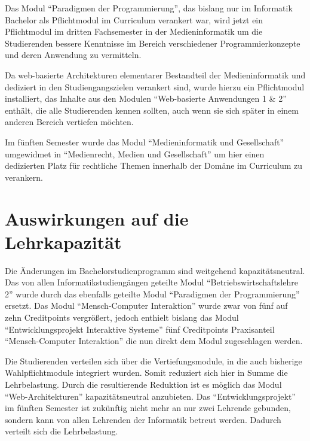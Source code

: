 Das Modul ``Paradigmen der Programmierung'', das bislang nur im
Informatik Bachelor als Pflichtmodul im Curriculum verankert war, wird
jetzt ein Pflichtmodul im dritten Fachsemester in der Medieninformatik
um die Studierenden bessere Kenntnisse im Bereich verschiedener
Programmierkonzepte und deren Anwendung zu vermitteln.

Da web-basierte Architekturen elementarer Bestandteil der
Medieninformatik und dediziert in den Studiengangszielen verankert sind,
wurde hierzu ein Pflichtmodul installiert, das Inhalte aus den Modulen
``Web-basierte Anwendungen 1 \& 2'' enthält, die alle Studierenden
kennen sollten, auch wenn sie sich später in einem anderen Bereich
vertiefen möchten.

Im fünften Semester wurde das Modul ``Medieninformatik und
Gesellschaft'' umgewidmet in ``Medienrecht, Medien und Gesellschaft'' um
hier einen dedizierten Platz für rechtliche Themen innerhalb der Domäne
im Curriculum zu verankern.

\section{Auswirkungen auf die
Lehrkapazität\label{/mi-2017/selbstbericht/0150-soll-zustand-geplante-veraenderungen/0000-geplante-veraenderungen-bachelor}}\label{auswirkungen-auf-die-lehrkapazituxe4tpathlabelmi-2017selbstbericht0150-soll-zustand-geplante-veraenderungen0000-geplante-veraenderungen-bachelor}

Die Änderungen im Bachelorstudienprogramm sind weitgehend
kapazitätsneutral. Das von allen Informatikstudiengängen geteilte Modul
``Betriebswirtschaftslehre 2'' wurde durch das ebenfalls geteilte Modul
``Paradigmen der Programmierung'' ersetzt. Das Modul ``Mensch-Computer
Interaktion'' wurde zwar von fünf auf zehn Creditpoints vergrößert,
jedoch enthielt bislang das Modul ``Entwicklungsprojekt Interaktive
Systeme'' fünf Creditpoints Praxisanteil ``Mensch-Computer Interaktion''
die nun direkt dem Modul zugeschlagen werden.

Die Studierenden verteilen sich über die Vertiefungsmodule, in die auch
bisherige Wahlpflichtmodule integriert wurden. Somit reduziert sich hier
in Summe die Lehrbelastung. Durch die resultierende Reduktion ist es
möglich das Modul ``Web-Architekturen'' kapazitätsneutral anzubieten.
Das ``Entwicklungsprojekt'' im fünften Semester ist zukünftig nicht mehr
an nur zwei Lehrende gebunden, sondern kann von allen Lehrenden der
Informatik betreut werden. Dadurch verteilt sich die Lehrbelastung.

